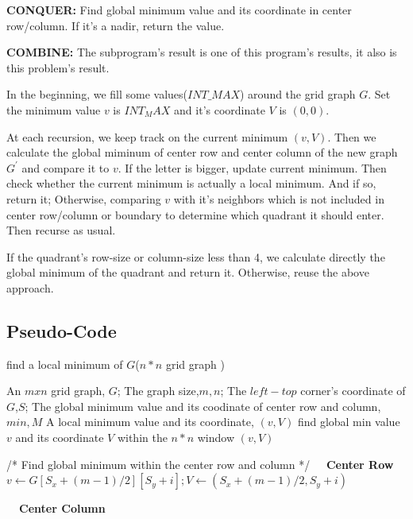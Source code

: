 \documentclass[UTF8,a4paper,12pt]{article}
\begin{document}
		\textbf{CONQUER: }Find global minimum value and its coordinate in center row/column. If it's a nadir, return the value.
		
		\textbf{COMBINE: }The subprogram's result is one of this program's results, it also is this problem's result.
	
		In the beginning, we fill some values($ INT\_MAX $) around the grid graph $ G $. Set the minimum value $ v $ is $ INT_MAX $ and it's coordinate $ V $ is $ (0,0) $. 
	
		At each recursion, we keep track on the current minimum $ (v,V) $. Then we calculate the global miminum of center row and center column of the new graph $ G^{'} $ and compare it to $ v $. If the letter is bigger, update current minimum. Then check whether the current minimum is actually a local minimum. And if so, return it; Otherwise, comparing $ v $ with it's neighbors which is not included in center row/column or boundary to determine which quadrant it should enter. Then recurse as usual.
	
		If the quadrant's row-size or column-size less than 4, we calculate directly the global minimum of the quadrant and return it. Otherwise, reuse the above approach.
	
	\subsection{Pseudo-Code}
	\begin{algorithm}[htb]
		\caption{find a local minimum of $G$($ n * n $ grid graph )}
		\begin{algorithmic}[1]
			\Require
				An $ m x n $ grid graph, $ G $;
				The graph size,$ m,n $;
				The $ left-top $ corner's coordinate of $ G $,$ S $;
				The global minimum value and its coodinate of center row and column,$ min,M $
			\Ensure
				A local minimum value and its coordinate, $ (v,V) $
					\State find global min value $v$ and its coordinate $V$ within the $ n * n $ window
					\State \Return $(v,V)$
				\EndIf
				
				\State /* Find global minimum within the center row and column */
					\textbf{\color{red}\ \  Center Row}
						\State $ v \gets G[S_{x}+(m-1)/2][S_{y}+i]; V \gets (S_{x}+(m-1)/2,S_{y}+i) $ 
					\EndIf
				\EndFor

					\textbf{\color{red}\ \ Center Column}
			\end{algorithmic}
		\end{algorithm}	
	
\end{document}
